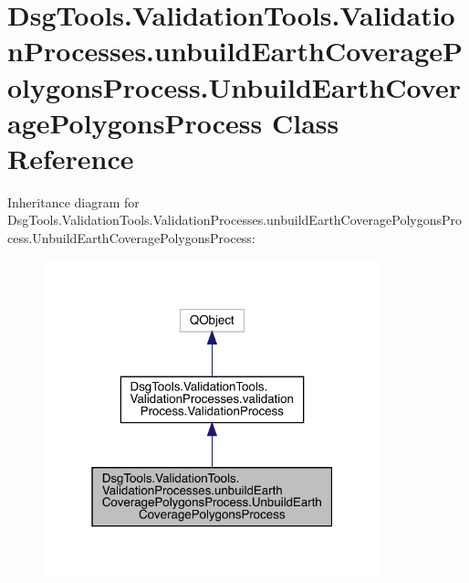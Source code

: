 \hypertarget{class_dsg_tools_1_1_validation_tools_1_1_validation_processes_1_1unbuild_earth_coverage_polygons7ae81ba48bc229a22209cc6a70ed6350}{}\section{Dsg\+Tools.\+Validation\+Tools.\+Validation\+Processes.\+unbuild\+Earth\+Coverage\+Polygons\+Process.\+Unbuild\+Earth\+Coverage\+Polygons\+Process Class Reference}
\label{class_dsg_tools_1_1_validation_tools_1_1_validation_processes_1_1unbuild_earth_coverage_polygons7ae81ba48bc229a22209cc6a70ed6350}


Inheritance diagram for Dsg\+Tools.\+Validation\+Tools.\+Validation\+Processes.\+unbuild\+Earth\+Coverage\+Polygons\+Process.\+Unbuild\+Earth\+Coverage\+Polygons\+Process\+:
\nopagebreak
\begin{figure}[H]
\begin{center}
\leavevmode
\includegraphics[width=277pt]{class_dsg_tools_1_1_validation_tools_1_1_validation_processes_1_1unbuild_earth_coverage_polygonsdc954b36ddbeb4f57c6c92f65762f657}
\end{center}
\end{figure}


